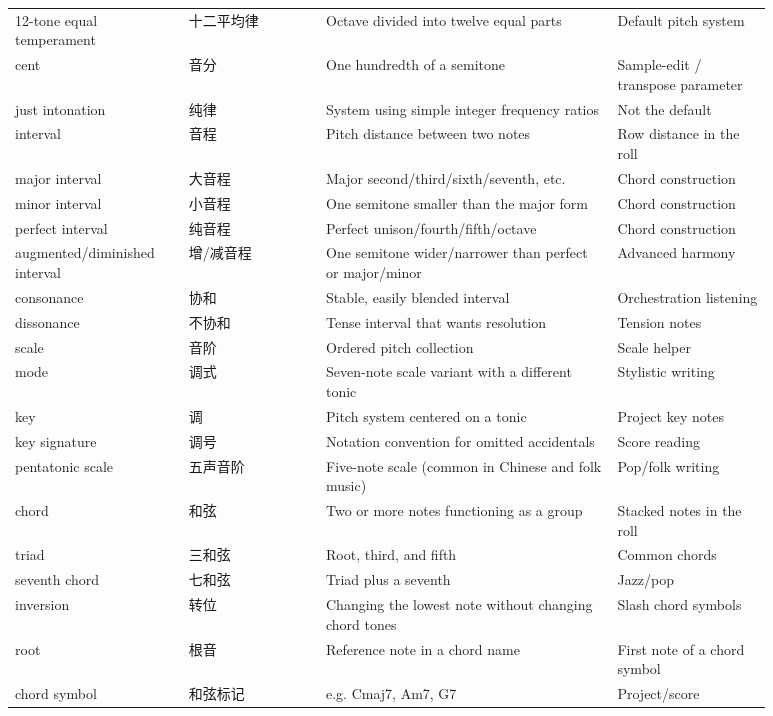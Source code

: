\begin{center}
\begin{longtable}{p{0.20\linewidth}p{0.16\linewidth}p{0.34\linewidth}p{0.18\linewidth}}
12-tone equal temperament & 十二平均律 & Octave divided into twelve equal parts & Default pitch system \\
cent & 音分 & One hundredth of a semitone & Sample-edit / transpose parameter \\
just intonation & 纯律 & System using simple integer frequency ratios & Not the default \\
interval & 音程 & Pitch distance between two notes & Row distance in the roll \\
major interval & 大音程 & Major second/\allowbreak third/\allowbreak sixth/\allowbreak seventh, etc. & Chord construction \\
minor interval & 小音程 & One semitone smaller than the major form & Chord construction \\
perfect interval & 纯音程 & Perfect unison/\allowbreak fourth/\allowbreak fifth/\allowbreak octave & Chord construction \\
augmented/\allowbreak diminished interval & 增/减音程 & One semitone wider/\allowbreak narrower than perfect or major/\allowbreak minor & Advanced harmony \\
consonance & 协和 & Stable, easily blended interval & Orchestration listening \\
dissonance & 不协和 & Tense interval that wants resolution & Tension notes \\
scale & 音阶 & Ordered pitch collection & Scale helper \\
mode & 调式 & Seven-note scale variant with a different tonic & Stylistic writing \\
key & 调 & Pitch system centered on a tonic & Project key notes \\
key signature & 调号 & Notation convention for omitted accidentals & Score reading \\
pentatonic scale & 五声音阶 & Five-note scale (common in Chinese and folk music) & Pop/folk writing \\
chord & 和弦 & Two or more notes functioning as a group & Stacked notes in the roll \\
triad & 三和弦 & Root, third, and fifth & Common chords \\
seventh chord & 七和弦 & Triad plus a seventh & Jazz/pop \\
inversion & 转位 & Changing the lowest note without changing chord tones & Slash chord symbols \\
root & 根音 & Reference note in a chord name & First note of a chord symbol \\
chord symbol & 和弦标记 & e.g. Cmaj7, Am7, G7 & Project/score \\

\end{longtable}
\end{center}
